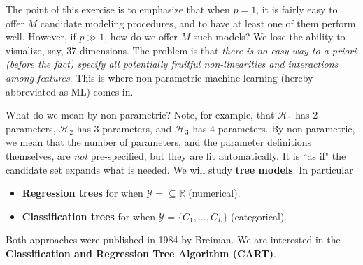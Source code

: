 \documentclass[12pt, a4paper]{article}
\theoremstyle{definition}
\begin{document}
	The point of this exercise is to emphasize that when $p = 1$, it is fairly easy
	to offer $M$ candidate modeling procedures, and to have at least one of them perform
	well. However, if $p \gg 1$, how do we offer $M$ such models? We lose the ability
	to visualize, say, 37 dimensions. The problem is that \textit{there is no easy
	way to a priori (before the fact) specify all potentially fruitful non-linearities
	and interactions among features}. This is where non-parametric machine learning
	(hereby abbreviated as ML) comes in.
	
	What do we mean by non-parametric? Note, for example, that $\mathcal{H}_1$
	has 2 parameters, $\mathcal{H}_2$ has 3 parameters, and $\mathcal{H}_3$ has
	4 parameters. By non-parametric, we mean that the number of parameters, and
	the parameter definitions themselves, are \textit{not} pre-specified,
	but they are fit automatically. It is ``as if" the candidate set expands
	what is needed. We will study \textbf{tree models}. In particular
	\begin{itemize}
		\item \textbf{Regression trees} for when $\mathcal{Y} = \subseteq \mathbb{R}$ (numerical).
		\item \textbf{Classification trees} for when $\mathcal{Y} = \{C_1, \ldots, C_L\}$
		(categorical).
	\end{itemize}
	Both approaches were published in 1984 by Breiman. We are interested in
	the \textbf{Classification and Regression Tree Algorithm (CART)}.
\end{document}
